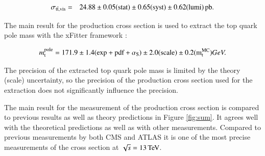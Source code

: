 \begin{eqnarray*}
\sigma_{\mathrm{t}\bar{\mathrm{t}},\mathrm{vis}} & = & 24.88 \pm 0.05({\rm stat}) \pm 0.65 ({\rm syst}) \pm 0.62({\rm lumi})\mbox{\ensuremath{\,\text{pb}}}. 
\end{eqnarray*}


The main result for the \ttbar production cross section is used to extract the top quark pole mass with the xFitter framework \cite{Alekhin:2014irh}:

\begin{equation}
m_\mathrm{t}^{\mathrm{pole}} = 171.9 \pm 1.4 \mathrm{(exp+pdf+\alpha_\mathrm{S})} \pm 2.0 \mathrm{(scale)} \pm 0.2 \mathrm{(m_\mathrm{t}^{\mathrm{MC}})} GeV . 
\end{equation}

The precision of the extracted top quark pole mass is limited by the theory (scale) uncertainty, so the precision of the \ttbar production cross section used for the 
extraction does not significantly influence the precision. 

The main result for the measurement of the \ttbar production cross section is compared to previous results as well as theory predictions in Figure \ref{fig:sum}.
It agrees well with the theoretical predictions as well as with other measurements. Compared to previous measurements by both CMS
and ATLAS it is one of the most precise measurements of the \ttbar cross section at $\sqrt{s} = 13 \,\text{Te\hspace{-.08em}V}$.

